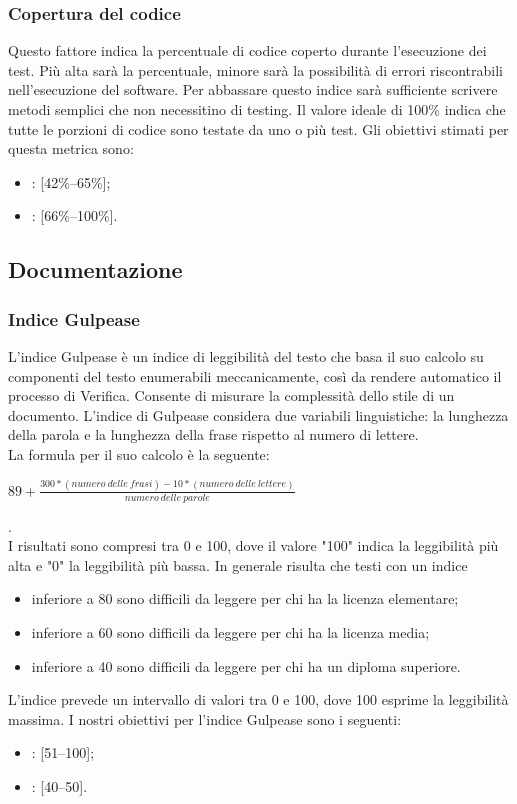 \subsubsection{Copertura del codice}
\label{4.2.9}
Questo fattore indica la percentuale di codice coperto durante l'esecuzione dei test. Più alta sarà la percentuale, minore sarà la possibilità di errori riscontrabili nell'esecuzione del software. Per abbassare questo indice sarà sufficiente scrivere metodi semplici che non necessitino di testing. Il valore ideale di 100\% indica che tutte le porzioni di codice sono testate da uno o più test.
Gli obiettivi stimati per questa metrica sono:
\begin{itemize}
\item {}: [42\%--65\%];
\item {}: [66\%--100\%].
\end{itemize}

\subsection{Documentazione}

\subsubsection{Indice Gulpease}
L'indice Gulpease è un indice di leggibilità del testo che basa il suo calcolo su componenti del testo enumerabili meccanicamente, così da rendere automatico il processo di Verifica. Consente di misurare la complessità dello stile di un documento.
L'indice di Gulpease considera due variabili linguistiche: la lunghezza della parola e la lunghezza della frase rispetto al numero di lettere.\\
La formula per il suo calcolo è la seguente:
\\
\begin{center}
\begin{math}
89+\frac{300*(numero\:delle\:frasi)-10*(numero\:delle\:lettere)}{numero\:delle\:parole}
\end{math}
\end{center}
.\\
I risultati sono compresi tra 0 e 100, dove il valore "100" indica la leggibilità più alta e "0" la leggibilità più bassa. In generale risulta che testi con un indice
\begin{itemize}
\item inferiore a 80 sono difficili da leggere per chi ha la licenza elementare;
\item inferiore a 60 sono difficili da leggere per chi ha la licenza media;
\item inferiore a 40 sono difficili da leggere per chi ha un diploma superiore.
\end{itemize}
L'indice prevede un intervallo di valori tra 0 e 100, dove 100 esprime la leggibilità massima.
I nostri obiettivi per l'indice Gulpease sono i seguenti:
\begin{itemize}
\item {}: [51--100];
\item {}: [40--50].
\end{itemize}

